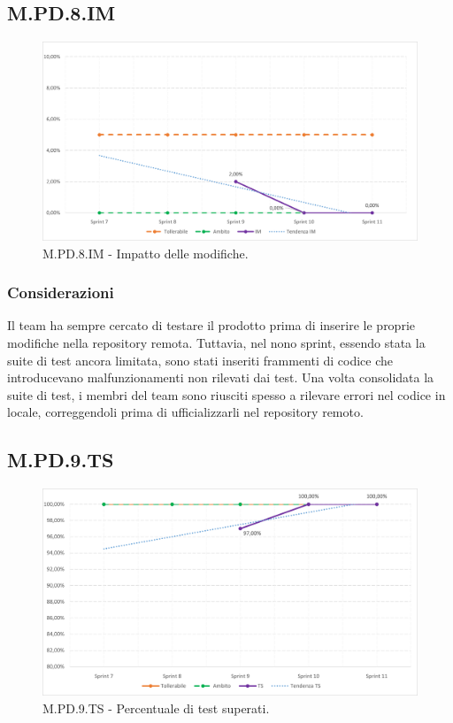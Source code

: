 \documentclass[10pt, a4paper]{article}
\begin{document}
\subsection{M.PD.8.IM}
\begin{figure}[H] \includegraphics[width=15.5cm]{img/metriche/MPD8IM.png} \caption{M.PD.8.IM - Impatto delle modifiche.} \end{figure} \subsubsection{Considerazioni}
Il team ha sempre cercato di testare il prodotto prima di inserire le proprie modifiche nella repository remota. Tuttavia, nel nono sprint, essendo stata la suite di test ancora limitata, sono stati inseriti frammenti di codice che introducevano malfunzionamenti non rilevati dai test. Una volta consolidata la suite di test, i membri del team sono riusciti spesso a rilevare errori nel codice in locale, correggendoli prima di ufficializzarli nel repository remoto.

\subsection{M.PD.9.TS}
\begin{figure}[H] \includegraphics[width=15.5cm]{img/metriche/MPD9TS.png} \caption{M.PD.9.TS - Percentuale di test superati.} \end{figure}
\end{document}
